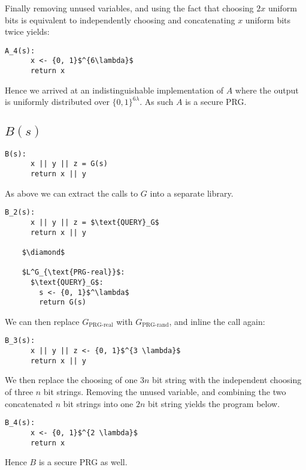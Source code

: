 \documentclass[a4paper]{scrreprt}
\begin{document}
Finally removing unused variables, and using the fact that choosing $2 x$
uniform bits is equivalent to independently choosing and concatenating $x$
uniform bits twice yields:

\begin{lstlisting}[mathescape=true, frame=single]
	A_4(s):
	  x <- {0, 1}$^{6\lambda}$
	  return x
\end{lstlisting}

Hence we arrived at an indistinguishable implementation of $A$ where the output
is uniformly distributed over $\{0, 1\}^{6 \lambda}$. As such $A$ is a secure
PRG.

\subsection{$B(s)$}

\begin{lstlisting}[mathescape=true, frame=single]
	B(s):
	  x || y || z = G(s)
	  return x || y
\end{lstlisting}

As above we can extract the calls to $G$ into a separate library.

\begin{lstlisting}[mathescape=true, frame=single]
	B_2(s):
	  x || y || z = $\text{QUERY}_G$
	  return x || y

	$\diamond$

	$L^G_{\text{PRG-real}}$:
	  $\text{QUERY}_G$:
	    s <- {0, 1}$^\lambda$
	    return G(s)
\end{lstlisting}

We can then replace $G_{\text{PRG-real}}$ with $G_{\text{PRG-rand}}$, and
inline the call again:

\begin{lstlisting}[mathescape=true, frame=single]
	B_3(s):
	  x || y || z <- {0, 1}$^{3 \lambda}$
	  return x || y
\end{lstlisting}

We then replace the choosing of one $3n$ bit string with the independent
choosing of three $n$ bit strings. Removing the unused variable, and combining
the two concatenated $n$ bit strings into one $2n$ bit string yields the
program below.

\begin{lstlisting}[mathescape=true, frame=single]
	B_4(s):
	  x <- {0, 1}$^{2 \lambda}$
	  return x
\end{lstlisting}

Hence $B$ is a secure PRG as well.
\end{document}
